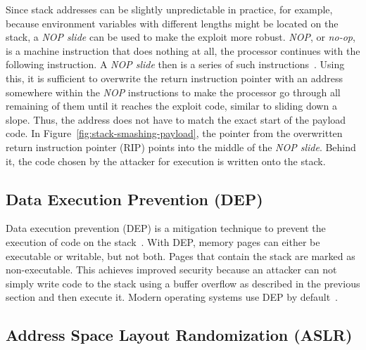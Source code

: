 

Since stack addresses can be slightly unpredictable in practice, for example, because environment variables with
different lengths might be located on the stack, a \textit{NOP slide} can be used to make the exploit more robust.
\textit{NOP}, or \textit{no-op}, is a machine instruction that does nothing at all, the processor continues with the
following instruction.
A \textit{NOP slide} then is a series of such instructions~\cite{vallentin2007}.
Using this, it is sufficient to overwrite the return instruction pointer with an address somewhere within the
\textit{NOP} instructions to make the processor go through all remaining of them until it reaches the exploit code,
similar to sliding down a slope.
Thus, the address does not have to match the exact start of the payload code.
In Figure~\ref{fig:stack-smashing-payload}, the pointer from the overwritten return instruction pointer (\acrshort{RIP})
points into the middle of the \textit{NOP slide}.
Behind it, the code chosen by the attacker for execution is written onto the stack.



\subsection{Data Execution Prevention (DEP)}\label{subsec:background:exploit-techniques:dep}

Data execution prevention (\acrshort{DEP}) is a mitigation technique to prevent the execution of code on the
stack~\cite{gao2013}.
With \acrshort{DEP}, memory pages can either be executable or writable, but not both.
Pages that contain the stack are marked as non-executable.
This achieves improved security because an attacker can not simply write code to the stack using a buffer overflow as
described in the previous section and then execute it.
Modern operating systems use \acrshort{DEP} by default~\cite{davi2011}.



\subsection{Address Space Layout Randomization (ASLR)}\label{subsec:background:exploit-techniques:aslr}

